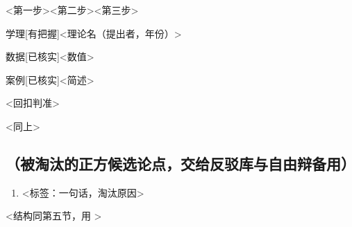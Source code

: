 \documentclass[prep,both]{debate}
\begin{document}
\begin{fields}
\begin{mechanism}\step <第一步>\step <第二步>\step <第三步>\end{mechanism}
\begin{evidence}{学理}[有把握]<理论名（提出者，年份）>\end{evidence}
\begin{evidence}{数据}[已核实]<数值>\end{evidence}
\begin{evidence}{案例}[已核实]<简述>\end{evidence}
\closing{<回扣判准>}
\begin{clash}\end{clash}
\end{fields}

<同上>

\subsection{（被淘汰的正方候选论点，交给反驳库与自由辩备用）}
\begin{enumerate}[leftmargin=1.8em]
\item <标签：一句话，淘汰原因>
\end{enumerate}

<结构同第五节，用 \consubsection>

\begin{rebuttals}
\end{rebuttals}

\begin{rebuttals}
\end{rebuttals}
\end{document}
